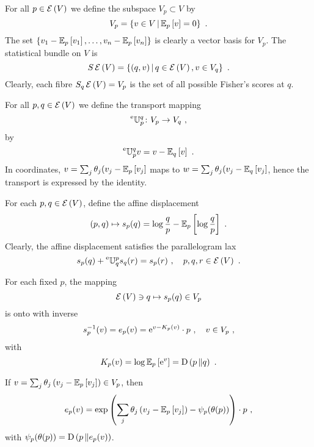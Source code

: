 \documentclass[12pt,a4paper]{amsart}
\begin{document}
For all $p \in \operatorname{\mathcal E}\left(V\right)$ we define the subspace $V_p \subset V$ by
\begin{equation}
V_p = \left\{v \in V \, \middle| \,  \operatorname{\mathbb E}_{p}\left[v\right] = 0 \right\} \ .
\end{equation}
The set $\left\{v_1 - \operatorname{\mathbb E}_{p}\left[v_1\right], \dots, v_n - \operatorname{\mathbb E}_{p}\left[v_n\right]\right\}$ is clearly a vector basis for $V_p$.
The statistical bundle on $V$ is
\begin{equation}
  \label{eq:statistical-bundle}
  S\maxexpat V = \setof {(q,v)} {q \in \maxexpat V, v \in V_q} \ .
\end{equation}
Clearly, each fibre $S_q\operatorname{\mathcal E}\left(V\right) = V_p$ is the set of all possible Fisher's scores at $q$.

For all $p,q \in \operatorname{\mathcal E}\left(V\right)$ we define the transport mapping
\begin{equation}
    \prescript{\text{e}}{} {\mathbb U} _ {p} ^ {q} \colon V_p \to V_q \ , 
\end{equation}
by \begin{equation}
    \etransport p q v = v - \expectat q v \ .
  \end{equation}
In coordinates, $v = \sum_j \theta_j (v_j - \operatorname{\mathbb E}_{p}\left[v_j\right]$ maps to $w = \sum_j \theta_j (v_j - \operatorname{\mathbb E}_{q}\left[v_j\right]$, hence the transport is expressed by the identity.
  
For each $p,q \in \operatorname{\mathcal E}\left(V\right)$, define the affine displacement
 \begin{equation}
     (p,q) \mapsto s_p(q) = \log \frac q p - \expectat p {\log \frac q p} \ .
   \end{equation}
Clearly, the affine displacement satisfies the parallelogram lax
\begin{equation}
  \label{eq:parallelogram-law}
  s_p(q) + \prescript{\text{e}}{} {\mathbb U} _ {q} ^ {p} s_q(r) = s_p(r) \ , \quad p,q,r \in \operatorname{\mathcal E}\left(V\right) \ .
\end{equation}

 For each fixed $p$, the mapping
 \begin{equation}
     \operatorname{\mathcal E}\left(V\right) \ni q \mapsto s_p(q) \in V_p
 \end{equation}
 is onto with inverse
 \begin{equation}
     s_p^{-1}(v) = e_p(v) = \mathrm{e}^{v - K_p(v)} \cdot p \ , \quad v \in V_p \ ,
 \end{equation}
 with
 \begin{equation}
     K_p(v) = \log \expectat p {\euler^v} = \KL p q \ .
   \end{equation}

 If $v = \sum_j \theta_j \left(v_j - \operatorname{\mathbb E}_{p}\left[v_j\right]\right) \in V_p$, then
 \begin{equation}
   \label{eq:p-parameterization}
   e_p(v) = \exp\left(\sum_j \theta_j \left(v_j - \operatorname{\mathbb E}_{p}\left[v_j\right]\right) - \psi_p(\theta(p))\right) \cdot p\ ,
 \end{equation}
 with $\psi_p(\theta(p)) = \operatorname{D}\left(p\,\Vert e_p(v)\right)$.
   
\end{document}
